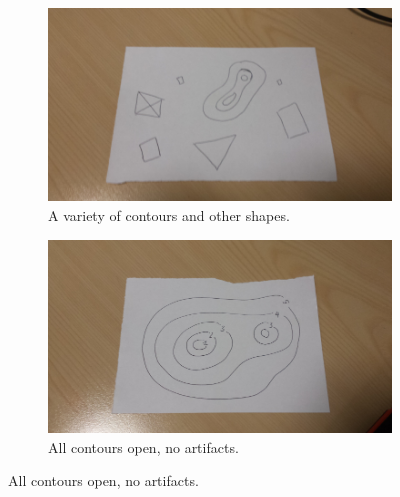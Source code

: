 \documentclass[11pt]{article}
\begin{document}
\begin{figure}[!ht]
	\centering
	\begin{subfigure}[t]{.4\textwidth}
		\centering
		\includegraphics[scale=0.3]{pics/normal.jpg}
		\caption{A variety of contours and other shapes.}
		\label{fig:landscapeMapNormal}
	\end{subfigure}
	\hfill
	\begin{subfigure}[t]{.4\textwidth}
		\centering
		\includegraphics[scale=0.3]{pics/height.jpg}
		\caption{All contours open, no artifacts.}
		\label{fig:landscapeMapHeight}
	\end{subfigure}
	

\end{figure}
\end{document}
